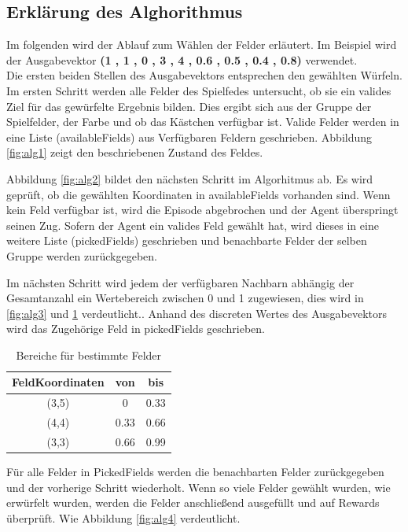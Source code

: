\newpage
\subsection{Erklärung des Alghorithmus}
Im folgenden wird der Ablauf zum Wählen der Felder erläutert. Im Beispiel wird der Ausgabevektor \textbf{(1 , 1 , 0 , 3 , 4 , 0.6 , 0.5 , 0.4 , 0.8)} verwendet. \\
Die ersten beiden Stellen des Ausgabevektors entsprechen den gewählten Würfeln.
Im ersten Schritt werden alle Felder des Spielfedes untersucht, ob sie ein valides Ziel für das gewürfelte Ergebnis bilden.
Dies ergibt sich aus der Gruppe der Spielfelder, der Farbe und ob das Kästchen verfügbar ist.
Valide Felder werden in eine Liste (availableFields) aus Verfügbaren Feldern geschrieben. Abbildung \ref{fig:alg1} zeigt den beschriebenen Zustand des Feldes.

Abbildung \ref{fig:alg2} bildet den nächsten Schritt im Algorhitmus ab.
Es wird geprüft, ob die gewählten Koordinaten in availableFields vorhanden sind.
Wenn kein Feld verfügbar ist, wird die Episode abgebrochen und der Agent überspringt seinen Zug.
Sofern der Agent ein valides Feld gewählt hat, wird dieses in eine weitere Liste (pickedFields) geschrieben und benachbarte Felder der selben Gruppe werden zurückgegeben.

Im nächsten Schritt wird jedem der verfügbaren Nachbarn abhängig der Gesamtanzahl ein Wertebereich zwischen 0 und 1 zugewiesen, dies wird in \ref{fig:alg3} und \ref{tab:field_ranges} verdeutlicht.. Anhand des discreten Wertes des Ausgabevektors wird das Zugehörige Feld in pickedFields geschrieben.
\begin{table}[!h]
    \centering
    \begin{tabular}{|c|c|c|}
    \hline
    \textbf{FeldKoordinaten} & \textbf{von} & \textbf{bis} \\
    \hline
    (3,5) & 0 & 0.33 \\
    \hline
    (4,4) & 0.33 & 0.66 \\
    \hline
    (3,3) & 0.66 & 0.99 \\
    \hline
    \end{tabular}
    \caption{Bereiche für bestimmte Felder}
    \label{tab:field_ranges}
\end{table}

Für alle Felder in PickedFields werden die benachbarten Felder zurückgegeben und der vorherige Schritt wiederholt.
Wenn so viele Felder gewählt wurden, wie erwürfelt wurden, werden die Felder anschließend ausgefüllt und auf Rewards überprüft.
Wie Abbildung \ref{fig:alg4} verdeutlicht.

